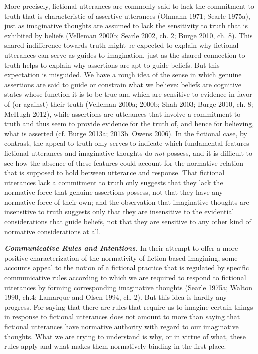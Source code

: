 More precisely, fictional utterances are commonly said to lack the commitment to truth that is characteristic of assertive utterances (Ohmann 1971; Searle 1975a), just as imaginative thoughts are assumed to lack the sensitivity to truth that is exhibited by beliefs (Velleman 2000b; Searle 2002, ch. 2; Burge 2010, ch. 8). This shared indifference towards truth might be expected to explain why fictional utterances can serve as guides to imagination, just as the shared connection to truth helps to explain why assertions are apt to guide beliefs. But this expectation is misguided. We have a rough idea of the sense in which genuine assertions are said to guide or constrain what we believe: beliefs are cognitive states whose function it is to be true and which are sensitive to evidence in favor of (or against) their truth (Velleman 2000a; 2000b; Shah 2003; Burge 2010, ch. 8; McHugh 2012), while assertions are utterances that involve a commitment to truth and thus seem to provide evidence for the truth of, and hence for believing, what is asserted (cf. Burge 2013a; 2013b; Owens 2006). In the fictional case, by contrast, the appeal to truth only serves to indicate which fundamental features fictional utterances and imaginative thoughts do \emph{not} possess, and it is difficult to see how the absence of these features could account for the normative relation that is supposed to hold between utterance and response. That fictional utterances lack a commitment to truth only suggests that they lack the normative force that genuine assertions possess, not that they have any normative force of their own; and the observation that imaginative thoughts are insensitive to truth suggests only that they are insensitive to the evidential considerations that guide beliefs, not that they are sensitive to any other kind of normative considerations at all.

\vspace{.2cm}
\noindent \textbf{\emph{Communicative Rules and Intentions.}} In their attempt to offer a more positive characterization of the normativity of fiction-based imagining, some accounts appeal to the notion of a fictional practice that is regulated by specific communicative rules according to which we are required to respond to fictional utterances by forming corresponding imaginative thoughts (Searle 1975a; Walton 1990, ch.4; Lamarque and Olsen 1994, ch. 2). But this idea is hardly any progress. For saying that there are rules that require us to imagine certain things in response to fictional utterances does not amount to more than saying that fictional utterances have normative authority with regard to our imaginative thoughts. What we are trying to understand is why, or in virtue of what, these rules apply and what makes them normatively binding in the first place.

